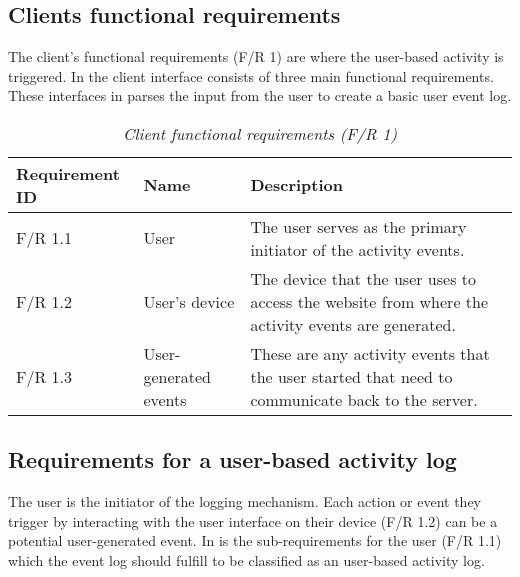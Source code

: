 \clearpage

\subsection{Clients functional requirements}

The client's functional requirements (F/R 1) are where the user-based activity is triggered. In  the client interface consists of three main functional requirements. These interfaces in  parses the input from the user to create a basic user event log. 

\begin{table}[!htb]
	\centering
	\small
	\caption[Client functional requirements]
	{\textit{Client functional requirements (F/R 1)}}
	\label{tbl:ch2:clientFunctionalRequirements}
	\begin{tabularx}{\textwidth}{|l|l|X|}
		\hline \textbf{Requirement ID} & \textbf{Name} & \textbf{Description} \\
		\hline F/R 1.1 & User & The user serves as the primary initiator of the activity events.\\
		\hline F/R 1.2 & User's device & The device that the user uses to access the website from where the activity events are generated.\\
		\hline F/R 1.3 & User-generated events & These are any activity events that the user started that need to communicate back to the server.\\
		\hline
	\end{tabularx}
\end{table}

\subsection{Requirements for a user-based activity log}
The user is the initiator of the logging mechanism. Each action or event they trigger by interacting with the user interface on their device (F/R 1.2) can be a potential user-generated event. In
 is the sub-requirements for the user (F/R 1.1) which the event log should fulfill to be classified as an user-based activity log.

